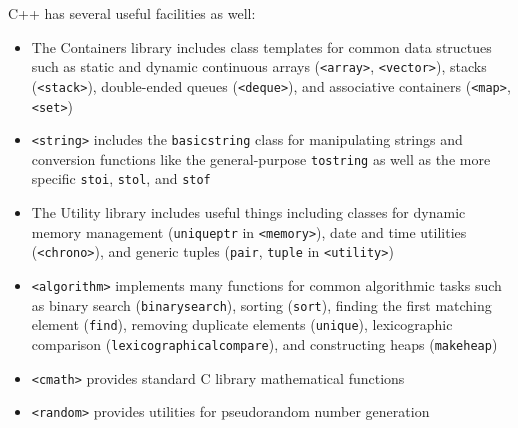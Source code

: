 \documentclass[12pt]{article}
\begin{document}
C++ has several useful facilities as well:
\begin{itemize}
    \item The Containers library includes class templates for common data structues such as static and dynamic continuous arrays (\texttt{<array>}, \texttt{<vector>}), stacks (\texttt{<stack>}), double-ended queues (\texttt{<deque>}), and associative containers (\texttt{<map>}, \texttt{<set>})
    \item \texttt{<string>} includes the \texttt{basic\ttul string} class for manipulating strings and conversion functions like the general-purpose \texttt{to\ttul string} as well as the more specific \texttt{stoi}, \texttt{stol}, and \texttt{stof}
    \item The Utility library includes useful things including classes for dynamic memory management (\texttt{unique\ttul ptr} in \texttt{<memory>}), date and time utilities (\texttt{<chrono>}), and generic tuples (\texttt{pair}, \texttt{tuple} in \texttt{<utility>})
    \item \texttt{<algorithm>} implements many functions for common algorithmic tasks such as binary search (\texttt{binary\ttul search}), sorting (\texttt{sort}), finding the first matching element (\texttt{find}), removing duplicate elements (\texttt{unique}), lexicographic comparison (\texttt{lexicographical\ttul compare}), and constructing heaps (\texttt{make\ttul heap})
    \item \texttt{<cmath>} provides standard C library mathematical functions
    \item \texttt{<random>} provides utilities for pseudorandom number generation
\end{itemize}
\end{document}

